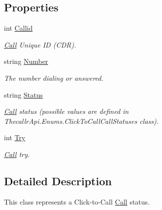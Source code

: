 \subsection*{Properties}
\begin{DoxyCompactItemize}
\item 
int \hyperlink{class_thecallr_api_1_1_objects_1_1_click_to_call_1_1_call_status_a5c05799b09c8b539e7dcd41159819326}{Callid}
\begin{DoxyCompactList}\small\item\em \hyperlink{class_thecallr_api_1_1_objects_1_1_click_to_call_1_1_call}{Call} Unique I\+D (C\+D\+R). \end{DoxyCompactList}\item 
string \hyperlink{class_thecallr_api_1_1_objects_1_1_click_to_call_1_1_call_status_aff24253003dbfffc671a694a61a6d272}{Number}
\begin{DoxyCompactList}\small\item\em The number dialing or answered. \end{DoxyCompactList}\item 
string \hyperlink{class_thecallr_api_1_1_objects_1_1_click_to_call_1_1_call_status_a0737314b722623d37fcc228c15fb92e1}{Status}
\begin{DoxyCompactList}\small\item\em \hyperlink{class_thecallr_api_1_1_objects_1_1_click_to_call_1_1_call}{Call} status (possible values are defined in Thecallr\+Api.\+Enums.\+Click\+To\+Call\+Call\+Statuses class). \end{DoxyCompactList}\item 
int \hyperlink{class_thecallr_api_1_1_objects_1_1_click_to_call_1_1_call_status_a740e9f272a7217ad55cd4ffae2c11a01}{Try}
\begin{DoxyCompactList}\small\item\em \hyperlink{class_thecallr_api_1_1_objects_1_1_click_to_call_1_1_call}{Call} try. \end{DoxyCompactList}\end{DoxyCompactItemize}


\subsection{Detailed Description}
This class represents a Click-\/to-\/\+Call \hyperlink{class_thecallr_api_1_1_objects_1_1_click_to_call_1_1_call}{Call} status. 



